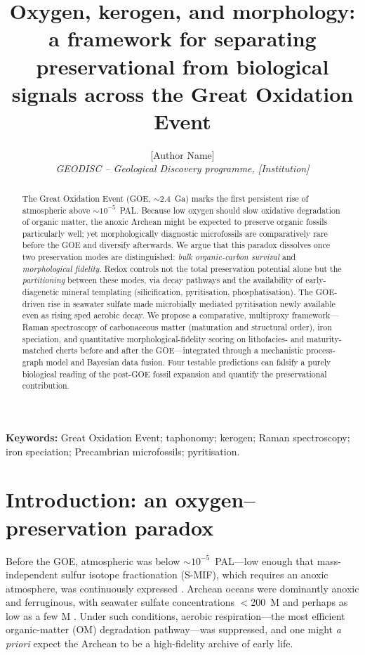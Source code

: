 \documentclass[11pt]{article}
\title{\vspace{-1.0cm}\textbf{Oxygen, kerogen, and morphology: a framework for separating
preservational from biological signals across the Great Oxidation Event}}
\author{[Author Name]\\
\small\textit{GEODISC -- Geological Discovery programme, [Institution]}}
\date{}
\begin{document}
\maketitle

\begin{abstract}\small
\noindent The Great Oxidation Event (GOE, $\sim$2.4~Ga) marks the first persistent rise of
atmospheric  above $\sim$$10^{-5}$~PAL. Because low oxygen should slow oxidative degradation
of organic matter, the anoxic Archean might be expected to preserve organic fossils particularly
well; yet morphologically diagnostic microfossils are comparatively rare before the GOE and
diversify afterwards. We argue that this paradox dissolves once two preservation modes are
distinguished: \emph{bulk organic-carbon survival} and \emph{morphological fidelity}. Redox
controls not the total preservation potential alone but the \emph{partitioning} between these
modes, via decay pathways and the availability of early-diagenetic mineral templating
(silicification, pyritisation, phosphatisation). The GOE-driven rise in seawater sulfate made
microbially mediated pyritisation newly available even as rising  sped aerobic decay. We
propose a comparative, multiproxy framework---Raman spectroscopy of carbonaceous matter (maturation
and structural order), iron speciation, and quantitative morphological-fidelity scoring on
lithofacies- and maturity-matched cherts before and after the GOE---integrated through a
mechanistic process-graph model and Bayesian data fusion. Four testable predictions can falsify a
purely biological reading of the post-GOE fossil expansion and quantify the preservational
contribution.
\end{abstract}

\noindent\textbf{Keywords:} Great Oxidation Event; taphonomy; kerogen; Raman spectroscopy;
iron speciation; Precambrian microfossils; pyritisation.

\section{Introduction: an oxygen--preservation paradox}

Before the GOE, atmospheric  was below $\sim$$10^{-5}$~PAL---low enough that mass-independent
sulfur isotope fractionation (S-MIF), which requires an anoxic atmosphere, was continuously
expressed \citep{Pavlov2002,Farquhar2000}. Archean oceans were dominantly anoxic and ferruginous,
with seawater sulfate concentrations $<$200~\textmu M and perhaps as low as a few \textmu M
\citep{Habicht2002,Crowe2014}. Under such conditions, aerobic respiration---the most efficient
organic-matter (OM) degradation pathway---was suppressed, and one might \emph{a priori} expect the
Archean to be a high-fidelity archive of early life.
\end{document}
